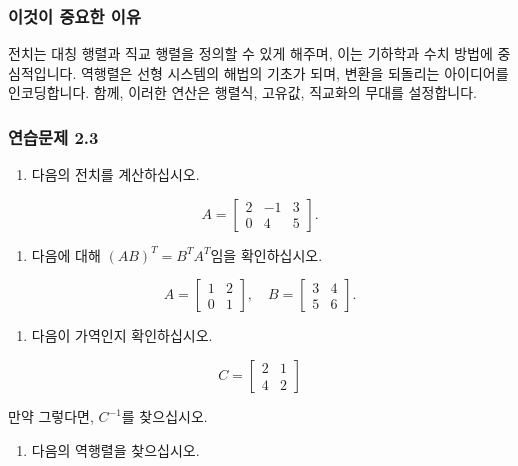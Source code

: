 \documentclass[
  12pt,
  a4paper,
]{article}
\begin{document}
\subsubsection{이것이 중요한 이유}\label{why-this-matters-6}

전치는 대칭 행렬과 직교 행렬을 정의할 수 있게 해주며, 이는 기하학과 수치 방법에 중심적입니다. 역행렬은 선형 시스템의 해법의 기초가 되며, 변환을 되돌리는 아이디어를 인코딩합니다. 함께, 이러한 연산은 행렬식, 고유값, 직교화의 무대를 설정합니다.

\subsubsection{연습문제 2.3}\label{exercises-23}

\begin{enumerate}
\def\labelenumi{\arabic{enumi}.}
\item
  다음의 전치를 계산하십시오.
\end{enumerate}

\[A = \begin{bmatrix} 2 & -1 & 3 \\ 0 & 4 & 5 \end{bmatrix}.\]

\begin{enumerate}
\def\labelenumi{\arabic{enumi}.}
\item
  다음에 대해 \((AB)^T = B^T A^T\)임을 확인하십시오.
\end{enumerate}

\[A = \begin{bmatrix}
1 & 2 \\
0 & 1 \end{bmatrix}, \quad
B = \begin{bmatrix}
3 & 4 \\
5 & 6 \end{bmatrix}.\]

\begin{enumerate}
\def\labelenumi{\arabic{enumi}.}
\item
  다음이 가역인지 확인하십시오.
\end{enumerate}

\[C = \begin{bmatrix}
2 & 1 \\
4 & 2 \end{bmatrix}\]

만약 그렇다면, \(C^{-1}\)를 찾으십시오.

\begin{enumerate}
\def\labelenumi{\arabic{enumi}.}
\item
  다음의 역행렬을 찾으십시오.
\end{enumerate}
\end{document}
